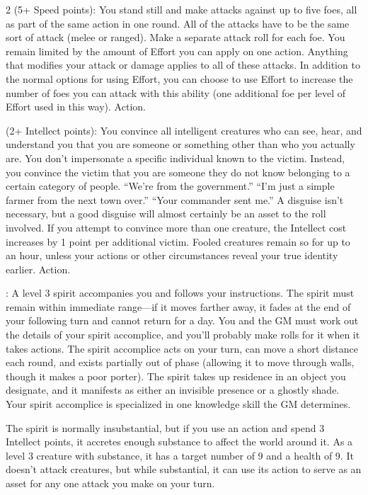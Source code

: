 \begin{multicols}{2}
 (5+ Speed points): You stand still and make attacks against up to five foes, all as part of the same action in one round. All of the attacks have to be the same sort of attack (melee or ranged). Make a separate attack roll for each foe. You remain limited by the amount of Effort you can apply on one action. Anything that modifies your attack or damage applies to all of these attacks. In addition to the normal options for using Effort, you can choose to use Effort to increase the number of foes you can attack with this ability (one additional foe per level of Effort used in this way). Action. 
 
 (2+ Intellect points): You convince all intelligent creatures who can see, hear, and understand you that you are someone or something other than who you actually are. You don’t impersonate a specific individual known to the victim. Instead, you convince the victim that you are someone they do not know belonging to a certain category of people. “We’re from the government.” “I’m just a simple farmer from the next town over.” “Your commander sent me.” A disguise isn’t necessary, but a good disguise will almost certainly be an asset to the roll involved. If you attempt to convince more than one creature, the Intellect cost increases by 1 point per additional victim. Fooled creatures remain so for up to an hour, unless your actions or other circumstances reveal your true identity earlier. Action. 
 
: A level 3 spirit accompanies you and follows your instructions. The spirit must remain within immediate range—if it moves farther away, it fades at the end of your following turn and cannot return for a day. You and the GM must work out the details of your spirit accomplice, and you’ll probably make rolls for it when it takes actions. The spirit accomplice acts on your turn, can move a short distance each round, and exists partially out of phase (allowing it to move through walls, though it makes a poor porter). The spirit takes up residence in an object you designate, and it manifests as either an invisible presence or a ghostly shade. Your spirit accomplice is specialized in one knowledge skill the GM determines. 

The spirit is normally insubstantial, but if you use an action and spend 3 Intellect points, it accretes enough substance to affect the world around it. As a level 3 creature with substance, it has a target number of 9 and a health of 9. It doesn’t attack creatures, but while substantial, it can use its action to serve as an asset for any one attack you make on your turn. 


\end{multicols}
